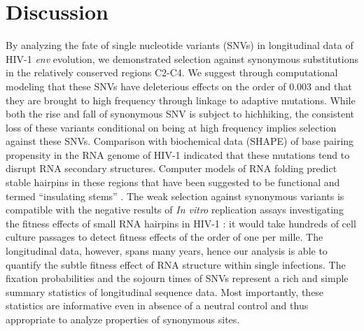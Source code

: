 \documentclass[11pt]{article}
\newcommand{\env}{\textit{env}}
\begin{document}
\section*{Discussion}
By analyzing the fate of single nucleotide variants (SNVs) in
longitudinal data of HIV-1 \env{} evolution, we demonstrated selection
against synonymous substitutions in the relatively conserved regions
C2-C4. We suggest through computational modeling that these
SNVs have deleterious effects on the order of $0.003$ and that they are
brought to high frequency through linkage to adaptive mutations.
While both the rise and fall of synonymous SNV is subject to hichhiking,
the consistent loss of these variants conditional on being at high
frequency implies selection against these SNVs.
Comparison with biochemical data (SHAPE) of base pairing propensity in the RNA
genome of HIV-1 indicated that these mutations tend to disrupt RNA secondary structures\citep{watts_architecture_2009}. Computer models
of RNA folding predict stable hairpins in these regions that
have been suggested to be functional and termed ``insulating
stems'' \citep{watts_architecture_2009, sanjuan_interplay_2011}.
The weak selection against synonymous variants is compatible with the
negative results of \textit{In vitro} replication assays investigating
the fitness effects of small RNA hairpins in HIV-1
\citep{knoepfel_role_2013}: it would take hundreds of cell culture
passages to detect fitness effects of the order of one per mille. The longitudinal data,
however, spans many years, hence our analysis is able to quantify the
subtle fitness effect of RNA structure within single infections. 
The fixation probabilities and the sojourn times of SNVs represent a
rich and simple summary statistics of longitudinal sequence data. Most
importantly, these statistics are informative even in absence of a
neutral control and thus appropriate to analyze properties of synonymous
sites. 
\end{document}
